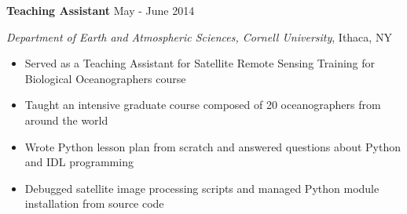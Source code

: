
\textbf{Teaching Assistant} \hfill May - June 2014

\textit{Department of Earth and Atmospheric Sciences, Cornell University}, Ithaca, NY

\begin{itemize}
    \item Served as a Teaching Assistant for Satellite Remote Sensing Training for Biological Oceanographers course
    \item Taught an intensive graduate course composed of 20 oceanographers from around the world
    \item Wrote Python lesson plan from scratch and answered questions about Python and IDL programming
    \item Debugged satellite image processing scripts and managed Python module installation from source code
\end{itemize}
